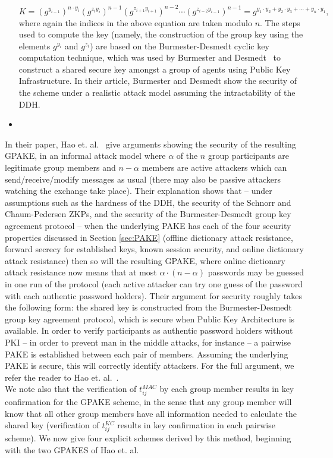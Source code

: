 \begin{itemize}
\begin{equation} K = (g^{y_{i-1}})^{n \cdot y_i} (g^{z_iy_i})^{n-1}(g^{z_{i+1}y_{i+1}})^{n-2} \cdots (g^{z_{i-2}y_{i-1}})^{n-1} =  g^{y_1 \cdot y_2 + y_2 \cdot y_3 + \cdots + y_n \cdot y_1}, \label{eq:key} \end{equation}
where again the indices in the above equation are taken modulo $n$. The steps used to compute the key (namely, the construction of the group key using the elements $g^{y_i}$ and $g^{z_i}$) are based on the Burmester-Desmedt cyclic key computation technique, which was used by Burmester and Desmedt~\cite{BuDe95} to construct a shared secure key amongst a group of agents using Public Key Infrastructure.  In their article, Burmester and Desmedt show the security of the scheme under a realistic attack model assuming the intractability of the DDH.
\item[]
\end{itemize}

In their paper, Hao et. al.~\cite{HaYiChSh15} give arguments showing the security of the resulting GPAKE, in an informal attack model where $\alpha$ of the $n$ group participants are legitimate group members and $n-\alpha$ members are active attackers which can send/receive/modify messages as usual (there may also be passive attackers watching the exchange take place).  Their  explanation shows that -- under assumptions such as the hardness of the DDH, the security of the Schnorr and Chaum-Pedersen ZKPs, and the security of the Burmester-Desmedt group key agreement protocol -- when the underlying PAKE has each of the four security properties discussed in Section \ref{sec:PAKE} (offline dictionary attack resistance, forward secrecy for established keys, known session security, and online dictionary attack resistance) then so will the resulting GPAKE, where online dictionary attack resistance now means that at most $\alpha \cdot (n - \alpha)$ passwords may be guessed in one run of the protocol (each active attacker can try one guess of the password with each authentic password holders).  Their argument for security roughly takes the following form: the shared key is constructed from the Burmester-Desmedt group key agreement protocol, which is secure when Public Key Architecture is available.  In order to verify participants as authentic password holders without PKI -- in order to prevent man in the middle attacks, for instance -- a pairwise PAKE is established between each pair of members.  Assuming the underlying PAKE is secure, this will correctly identify attackers. For the full argument, we refer the reader to Hao et. al.~\cite{HaYiChSh15}.
\\

We note also that the verification of $t_{ij}^{MAC}$ by each group member results in key confirmation for the GPAKE scheme, in the sense that any group member will know that all other group members have all information needed to calculate the shared key (verification of $t_{ij}^{KC}$ results in key confirmation in each pairwise scheme).  We now give four explicit schemes derived by this method, beginning with the two GPAKES of Hao et. al.



